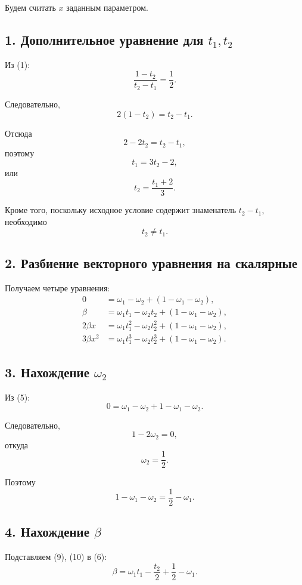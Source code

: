 \documentclass[12pt,a4paper]{article}
\begin{document}
		Будем считать $x$ заданным параметром.
		
		\subsection*{1. Дополнительное уравнение для $t_1,t_2$}
		
		Из (1):
		\[
		\frac{1-t_2}{t_2-t_1}=\frac12.
		\]
		
		Следовательно,
		\[
		2(1-t_2)=t_2-t_1.
		\]
		
		Отсюда
		\[
		2-2t_2=t_2-t_1,
		\]
		поэтому
		\[
		\boxed{t_1=3t_2-2},
		\tag{2}
		\]
		или
		\[
		\boxed{t_2=\frac{t_1+2}{3}}.
		\tag{3}
		\]
		
		Кроме того, поскольку исходное условие содержит знаменатель
		$t_2-t_1$, необходимо
		\[
		\boxed{t_2\neq t_1}.
		\tag{4}
		\]
		
		\subsection*{2. Разбиение векторного уравнения на скалярные}
		
		Получаем четыре уравнения:
		\begin{align}
			0&=\omega_1-\omega_2+(1-\omega_1-\omega_2),
			\tag{5}\\
			\beta&=\omega_1t_1-\omega_2t_2+(1-\omega_1-\omega_2),
			\tag{6}\\
			2\beta x&=\omega_1t_1^2-\omega_2t_2^2+(1-\omega_1-\omega_2),
			\tag{7}\\
			3\beta x^2&=\omega_1t_1^3-\omega_2t_2^3+(1-\omega_1-\omega_2).
			\tag{8}
		\end{align}
		
		\subsection*{3. Нахождение $\omega_2$}
		
		Из (5):
		\[
		0=\omega_1-\omega_2+1-\omega_1-\omega_2.
		\]
		
		Следовательно,
		\[
		1-2\omega_2=0,
		\]
		откуда
		\[
		\boxed{\omega_2=\frac12}.
		\tag{9}
		\]
		
		Поэтому
		\[
		1-\omega_1-\omega_2
		=
		\frac12-\omega_1.
		\tag{10}
		\]
		
		\subsection*{4. Нахождение $\beta$}
		
		Подставляем (9), (10) в (6):
		\[
		\beta
		=
		\omega_1t_1
		-\frac{t_2}{2}
		+\frac12-\omega_1.
		\]
		
\end{document}
